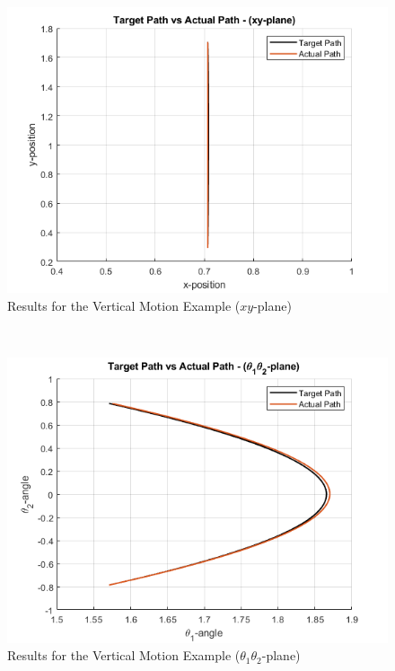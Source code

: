 \documentclass[letterpaper, 10 pt, conference]{ieeeconf}
\begin{document}
{\centering
\begin{figure}[htbp]
\captionsetup{justification=centering}
\centerline{\includegraphics[scale=.475]{results_2_1.png}}
\caption{Results for the Vertical Motion Example ($xy$-plane)}
\label{fig}
\end{figure}
\\
\begin{figure}[htbp]
\captionsetup{justification=centering}
\centerline{\includegraphics[scale=.475]{results_2_2.png}}
\caption{Results for the Vertical Motion Example ($\theta_{1}\theta_{2}$-plane)}
\label{fig}
\end{figure}
}
\end{document}
